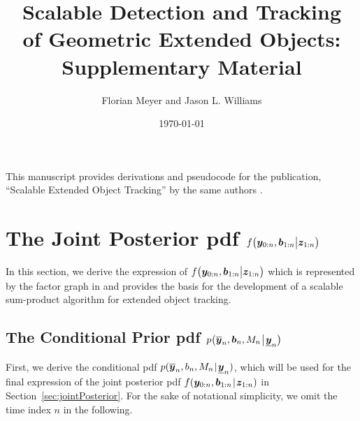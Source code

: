 \documentclass[11pt,a4paper]{article}
\newcommand{\ist}{\hspace*{.3mm}}
\begin{document}
\onehalfspacing


\title{\vspace{-5mm} Scalable Detection and Tracking\\[-1.5mm] of Geometric Extended Objects:\\[-1.5mm] Supplementary Material\vspace{0mm}}
\author{Florian Meyer and Jason L. Williams \vspace*{0mm}} 
\date{\today\vspace{-5mm}}

\maketitle

\renewcommand{\baselinestretch}{1.13}\small\normalsize

\noindent This manuscript provides derivations and pseudocode for the publication, ``Scalable Extended Object Tracking'' by the same authors \cite{MeyWil:J21}. 

\section{The Joint Posterior \ac{pdf} $f \big( \bm{y}_{0:n}, \bm{b}_{1:n} \big |\bm{z}_{1:n} \big)$}

In this section, we derive the expression of $f \big( \bm{y}_{0:n}, \bm{b}_{1:n} \big |\bm{z}_{1:n} \big)$ which is represented by the factor graph in \cite[Fig.~2]{MeyWil:J21}  and provides the basis for the development of a scalable sum-product algorithm for extended object tracking.

\subsection{The Conditional Prior \ac{pdf} $p \big (\overline{\V{y}}_n, \V{b}_n, M_n \ist \big | \ist \underline{\V{y}}_n \big)$}

First, we derive the conditional \ac{pdf} $p(\overline{\V{y}}_n, b_n, M_n \ist | \ist \underline{\V{y}}_n)$, which will be used for the final expression of the joint posterior \ac{pdf} $f( \V{y}_{0:n}, \V{b}_{1:n}  \ist | \ist \V{z}_{1:n} )$ in Section~\ref{sec:jointPosterior}. For the sake of notational simplicity, we omit
the time index $n$ in the following.
\end{document}
